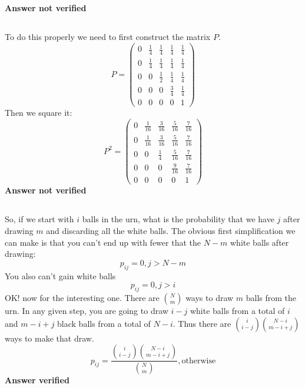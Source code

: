 \textbf{Answer not verified}

\subsection{}
To do this properly we need to first construct the matrix $P$.
\begin{equation}
P = \left(
\begin{array}{ccccc}
 0 & \frac{1}{4} & \frac{1}{4} & \frac{1}{4} & \frac{1}{4} \\
 0 & \frac{1}{4} & \frac{1}{4} & \frac{1}{4} & \frac{1}{4} \\
 0 & 0 & \frac{1}{2} & \frac{1}{4} & \frac{1}{4} \\
 0 & 0 & 0 & \frac{3}{4} & \frac{1}{4} \\
 0 & 0 & 0 & 0 & 1
\end{array}
\right)
\end{equation}
Then we square it:
\begin{equation}
P^2 = 
\left(
\begin{array}{ccccc}
 0 & \frac{1}{16} & \frac{3}{16} & \frac{5}{16} & \frac{7}{16} \\
 0 & \frac{1}{16} & \frac{3}{16} & \frac{5}{16} & \frac{7}{16} \\
 0 & 0 & \frac{1}{4} & \frac{5}{16} & \frac{7}{16} \\
 0 & 0 & 0 & \frac{9}{16} & \frac{7}{16} \\
 0 & 0 & 0 & 0 & 1
\end{array}
\right)\end{equation}
\textbf{Answer not verified}


\subsection{}
So, if we start with $i$ balls in the urn, what is the probability that we have $j$ after drawing $m$ and discarding all the white balls.  The obvious first simplification we can make is that you can't end up with fewer that the $N-m$ white balls after drawing:
\begin{equation}
	p_{ij} = 0, j > N - m
\end{equation}
You also can't gain white balls
\begin{equation}
	p_{ij} = 0, j > i 
\end{equation}
OK! now for the interesting one.  There are $\binom{N}{m}$ ways to draw $m$ balls from the urn.  In any given step, you are going to draw $i-j$ white balls from a total of $i$ and $m - i +j$ black balls from a total of $N-i$.  Thus there are $\binom{i}{i-j}\binom{N-i}{m - i +j}$ ways to make that draw.
\begin{equation}
	p_{ij} = \frac{\binom{i}{i-j}\binom{N-i}{m - i +j}}{\binom{N}{m}}, \text{otherwise}
\end{equation}
\textbf{Answer verified}

